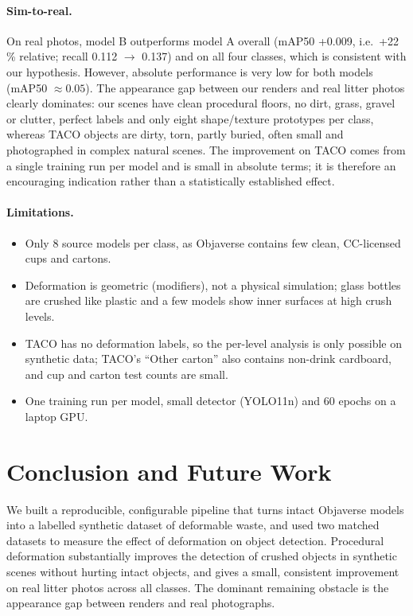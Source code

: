 \documentclass[11pt,a4paper]{article}
\begin{document}
\paragraph{Sim-to-real.} On real photos, model B outperforms model A overall (mAP50 +0.009,
i.e.\ +22\,\% relative; recall 0.112 $\rightarrow$ 0.137) and on all four classes, which is
consistent with our hypothesis. However, absolute performance is very low for both models
(mAP50 $\approx 0.05$). The appearance gap between our renders and real litter photos clearly
dominates: our scenes have clean procedural floors, no dirt, grass, gravel or clutter, perfect
labels and only eight shape/texture prototypes per class, whereas TACO objects are dirty, torn,
partly buried, often small and photographed in complex natural scenes. The improvement on TACO
comes from a single training run per model and is small in absolute terms; it is therefore an
encouraging indication rather than a statistically established effect.

\paragraph{Limitations.}
\begin{itemize}
  \item Only 8 source models per class, as Objaverse contains few clean, CC-licensed cups and
        cartons.
  \item Deformation is geometric (modifiers), not a physical simulation; glass bottles are
        crushed like plastic and a few models show inner surfaces at high crush levels.
  \item TACO has no deformation labels, so the per-level analysis is only possible on synthetic
        data; TACO's ``Other carton'' also contains non-drink cardboard, and cup and carton test
        counts are small.
  \item One training run per model, small detector (YOLO11n) and 60 epochs on a laptop GPU.
\end{itemize}

\section{Conclusion and Future Work}

We built a reproducible, configurable pipeline that turns intact Objaverse models into a
labelled synthetic dataset of deformable waste, and used two matched datasets to measure the
effect of deformation on object detection. Procedural deformation substantially improves the
detection of crushed objects in synthetic scenes without hurting intact objects, and gives a
small, consistent improvement on real litter photos across all classes. The dominant remaining
obstacle is the appearance gap between renders and real photographs.
\end{document}
